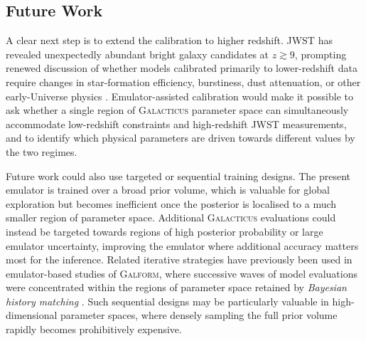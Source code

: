 \documentclass[twocolumn, apj, numberedappendix, iop]{openjournal}
\newcommand{\galacticus}{\textsc{Galacticus}\xspace}
\begin{document}


\subsection{Future Work}

A clear next step is to extend the calibration to higher redshift. JWST has revealed unexpectedly abundant bright galaxy candidates at $z \gtrsim 9$, prompting renewed discussion of whether models calibrated primarily to lower-redshift data require changes in star-formation efficiency, burstiness, dust attenuation, or other early-Universe physics \citep[e.g.][]{2023MNRAS.519..843M, 2024ApJ...976L..15C}. Emulator-assisted calibration would make it possible to ask whether a single region of \galacticus{} parameter space can simultaneously accommodate low-redshift constraints and high-redshift JWST measurements, and to identify which physical parameters are driven towards different values by the two regimes.

Future work could also use targeted or sequential training designs. The present emulator is trained over a broad prior volume, which is valuable for global exploration but becomes inefficient once the posterior is localised to a much smaller region of parameter space. Additional \galacticus{} evaluations could instead be targeted towards regions of high posterior probability or large emulator uncertainty, improving the emulator where additional accuracy matters most for the inference. Related iterative strategies have previously been used in emulator-based studies of \textsc{Galform}, where successive waves of model evaluations were concentrated within the regions of parameter space retained by \emph{Bayesian history matching} \citep{2010MNRAS.407.2017B, 2014arXiv1405.4976V, 2017MNRAS.466.2418R}. Such sequential designs may be particularly valuable in high-dimensional parameter spaces, where densely sampling the full prior volume rapidly becomes prohibitively expensive.
\end{document}
